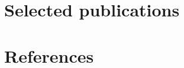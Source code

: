 \documentclass[a4paper]{twentysecondcv} %
\begin{document}
\vspace*{1em}



\section{Selected publications}


\let\oldsection=\section
\renewcommand{\section}[2]{}%
{\footnotesize
\nocite{*}


}
\let\section=\oldsection

\vspace*{1.3em}







\section{References}
\end{document}
